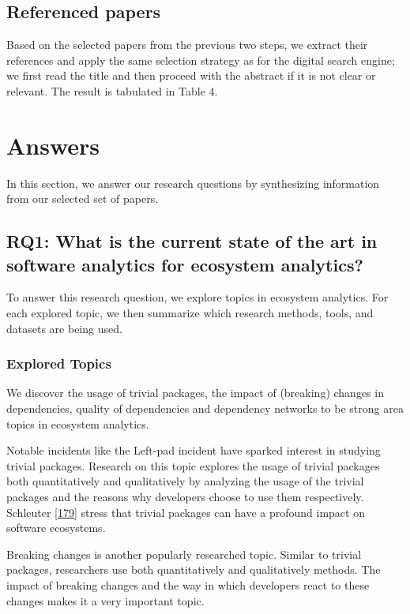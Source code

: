\documentclass[]{book}
\begin{document}
\subsection{Referenced papers}\label{referenced-papers}

Based on the selected papers from the previous two steps, we extract
their references and apply the same selection strategy as for the
digital search engine; we first read the title and then proceed with the
abstract if it is not clear or relevant. The result is tabulated in
Table 4.

\section{Answers}\label{answers-2}

In this section, we answer our research questions by synthesizing
information from our selected set of papers.

\subsection{RQ1: What is the current state of the art in software
analytics for ecosystem
analytics?}\label{rq1-what-is-the-current-state-of-the-art-in-software-analytics-for-ecosystem-analytics}

To answer this research question, we explore topics in ecosystem
analytics. For each explored topic, we then summarize which research
methods, tools, and datasets are being used.

\subsubsection{Explored Topics}\label{explored-topics}

We discover the usage of trivial packages, the impact of (breaking)
changes in dependencies, quality of dependencies and dependency networks
to be strong area topics in ecosystem analytics.

Notable incidents like the Left-pad incident have sparked interest in
studying trivial packages. Research on this topic explores the usage of
trivial packages both quantitatively and qualitatively by analyzing the
usage of the trivial packages and the reasons why developers choose to
use them respectively. Schleuter
{[}\protect\hyperlink{ref-NPM2016}{179}{]} stress that trivial packages
can have a profound impact on software ecosystems.

Breaking changes is another popularly researched topic. Similar to
trivial packages, researchers use both quantitatively and qualitatively
methods. The impact of breaking changes and the way in which developers
react to these changes makes it a very important topic.
\end{document}
